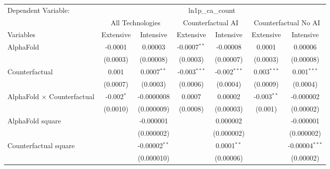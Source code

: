 \begingroup
\centering
\begin{tabular}{lcccccc}
   \tabularnewline \midrule \midrule
   Dependent Variable: & \multicolumn{6}{c}{ln1p\_ca\_count}\\
 & \multicolumn{2}{c}{All Technologies} & \multicolumn{2}{c}{Counterfactual AI} & \multicolumn{2}{c}{Counterfactual No AI} \\
\cmidrule(lr){1-1}\cmidrule(lr){2-3} \cmidrule(lr){4-5} \cmidrule(lr){6-7}
Variables & \multicolumn{1}{c}{Extensive} & \multicolumn{1}{c}{Intensive} & \multicolumn{1}{c}{Extensive} & \multicolumn{1}{c}{Intensive} & \multicolumn{1}{c}{Extensive} & \multicolumn{1}{c}{Intensive} \\
\cmidrule(lr){1-1}\cmidrule(lr){2-2} \cmidrule(lr){3-3} \cmidrule(lr){4-4} \cmidrule(lr){5-5} \cmidrule(lr){6-6} \cmidrule(lr){7-7}
   AlphaFold                          & -0.0001      & 0.00003           & -0.0007$^{**}$ & -0.00008       & 0.0001        & 0.00006\\   
                                      & (0.0003)     & (0.00008)         & (0.0003)       & (0.00007)      & (0.0003)      & (0.00008)\\   
   Counterfactual                     & 0.001        & 0.0007$^{**}$     & -0.003$^{***}$ & -0.002$^{***}$ & 0.003$^{***}$ & 0.001$^{***}$\\   
                                      & (0.0007)     & (0.0003)          & (0.0006)       & (0.0004)       & (0.0009)      & (0.0004)\\   
   AlphaFold $\times$ Counterfactual  & -0.002$^{*}$ & -0.0000008        & 0.0007         & 0.00002        & -0.003$^{**}$ & -0.000002\\   
                                      & (0.0010)     & (0.000009)        & (0.0008)       & (0.00003)      & (0.001)       & (0.00002)\\   
   AlphaFold square                   &              & -0.000001         &                & 0.000002       &               & -0.000001\\   
                                      &              & (0.000002)        &                & (0.000002)     &               & (0.000002)\\   
   Counterfactual square              &              & -0.00002$^{**}$   &                & 0.0001$^{**}$  &               & -0.00004$^{***}$\\   
                                      &              & (0.000010)        &                & (0.00006)      &               & (0.00002)\\   

\end{tabular}
